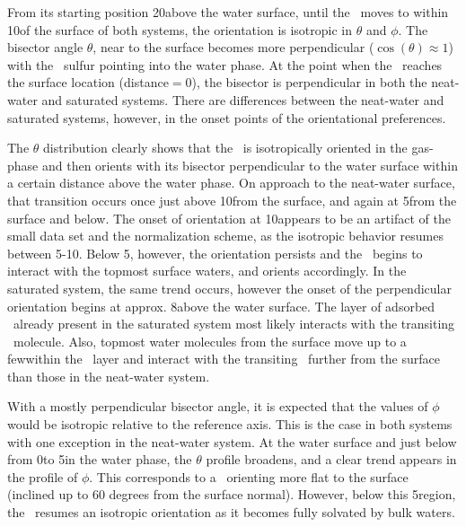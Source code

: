 	From its starting position 20\angs above the water surface, until the \suldiox~moves to within 10\angs of the surface of both systems, the orientation is isotropic in $\theta$ and $\phi$. The bisector angle $\theta$, near to the surface becomes more perpendicular ($\cos(\theta)\approx1$) with the \suldiox~sulfur pointing into the water phase. At the point when the \suldiox~reaches the surface location (distance$=0$), the bisector is perpendicular in both the neat-water and saturated systems. There are differences between the neat-water and saturated systems, however, in the onset points of the orientational preferences.
 
  The $\theta$ distribution clearly shows that the \suldiox~is isotropically oriented in the gas-phase and then orients with its bisector perpendicular to the water surface within a certain distance above the water phase. On approach to the neat-water surface, that transition occurs once just above 10\angs from the surface, and again at 5\angs from the surface and below. The onset of orientation at 10\angs appears to be an artifact of the small data set and the normalization scheme, as the isotropic behavior resumes between 5-10\angs. Below 5\angs, however, the orientation persists and the \suldiox~begins to interact with the topmost surface waters, and orients accordingly. In the saturated system, the same trend occurs, however the onset of the perpendicular orientation begins at approx. 8\angs above the water surface. The layer of adsorbed \suldiox~already present in the saturated system most likely interacts with the transiting \suldiox~molecule. Also, topmost water molecules from the surface move up to a few\angs within the \suldiox~layer and interact with the transiting \suldiox~further from the surface than those in the neat-water system.

  With a mostly perpendicular bisector angle, it is expected that the values of $\phi$ would be isotropic relative to the reference axis. This is the case in both systems with one exception in the neat-water system. At the water surface and just below from 0\angs to 5\angs in the water phase, the $\theta$ profile broadens, and a clear trend appears in the profile of $\phi$. This corresponds to a \suldiox~orienting more flat to the surface (inclined up to 60 degrees from the surface normal). However, below this 5\angs region, the \suldiox~resumes an isotropic orientation as it becomes fully solvated by bulk waters.

